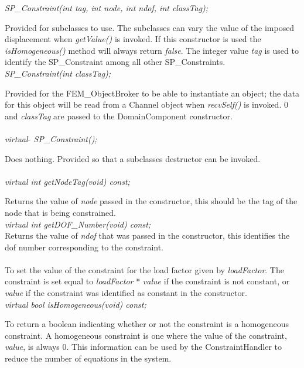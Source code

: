 {\em SP\_Constraint(int tag, int node, int ndof, int classTag);} 

Provided for subclasses to use. The subclasses can vary the value of the
imposed displacement when {\em getValue()} is invoked. If this
constructor is used the {\em isHomogeneous()} method will always
return {\em false}. The integer value {\em tag} is used to identify
the SP\_Constraint among all other SP\_Constraints. \\


{\em SP\_Constraint(int classTag);} 

Provided for the FEM\_ObjectBroker to be able to instantiate an
object; the data for this object will be read from a Channel object
when {\em recvSelf()} is invoked. $0$ and {\em classTag} are passed to
the DomainComponent constructor. \\


  \\
{\em virtual $\tilde{ }$ SP\_Constraint();} 

Does nothing. Provided so that a subclasses destructor can be
invoked. \\


  \\
{\em virtual int getNodeTag(void) const;} 

Returns the value of {\em node} passed in the constructor, this should be 
the tag of the node that is being constrained. \\

{\em virtual int getDOF\_Number(void) const;} \\
Returns the value of {\em ndof} that was passed in the constructor,
this identifies the dof number corresponding to the constraint. \\

\\ 
To set the value of the constraint for the load factor given by {\em
loadFactor}. The constraint is set equal to {\em loadFactor} * {\em
value} if the constraint is not constant, or {\em value} if the
constraint was identified as constant in the constructor. \\

{\em virtual bool isHomogeneous(void) const;}

To return a boolean indicating whether or not the constraint is a
homogeneous constraint. A homogeneous constraint is one where the value
of the constraint, {\em value}, is always $0$. This information can be used by the
ConstraintHandler to reduce the number of equations in the system. \\

